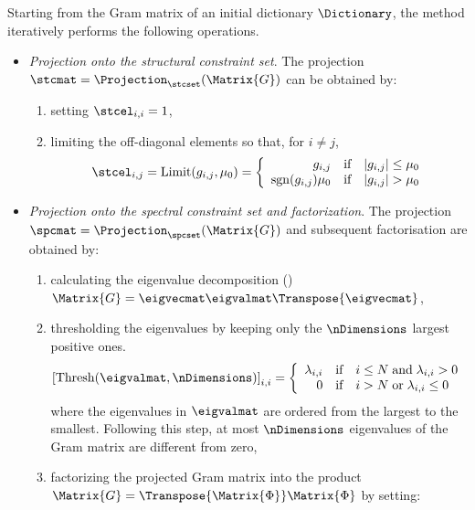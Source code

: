 \documentclass{article}
\def \Dic{\Matrix{\Phi}} %
\def \coherence{\mu} 		%
\def \Gram{\Matrix{G}} 						%
\def \gram{g} 								%
\begin{document}
Starting from the Gram matrix of an initial dictionary $\Dictionary$, the  method iteratively performs the following operations.
\begin{itemize}
\item \emph{Projection onto the structural constraint set}. The projection $\stcmat = \Projection_{\stcset}(\Gram)$ can be obtained by:
\begin{enumerate}
\item setting $\stcel_{i,i} = 1$,
\item limiting the off-diagonal elements so that, for $i \neq j$, 
\small
\begin{equation}\label{eq:pscs}
\stcel_{i,j} = \operatorname{Limit}({\gram}_{i,j},\coherence_{0}) = \left\{ \begin{array}{rl}
	\gram_{i,j}  & \text{if} \quad |\gram_{i,j}|\leq \coherence_{0} \\
	\operatorname{sgn}(\gram_{i,j})\coherence_{0}  & \text{if} \quad |\gram_{i,j}| > \coherence_{0}
\end{array} \right.
\end{equation}
\normalsize
\end{enumerate}
\item \emph{Projection onto the spectral constraint set and factorization}. The projection $\spcmat = \Projection_{\spcset}(\Gram)$ and subsequent factorisation are obtained by:
\begin{enumerate}
\item calculating the eigenvalue decomposition () $\Gram = \eigvecmat \eigvalmat \Transpose{\eigvecmat}$,
\item thresholding the eigenvalues by keeping only the $\nDimensions$ largest positive ones.
\begin{equation*}
	\left[\operatorname{Thresh}(\eigvalmat,\nDimensions) \right]_{i,i} = \left\{ \begin{array}{rl}
	\lambda_{i,i}  & \text{if} \quad i \leq N \; \text{and} \; \lambda_{i,i}>0 \\
	0  & \text{if} \quad i > N \; \text{or} \; \lambda_{i,i}\leq 0
	\end{array}\right.
\end{equation*}
where the eigenvalues in $\eigvalmat$ are ordered from the largest to the smallest. Following this step, at most $\nDimensions$ eigenvalues of the Gram matrix are different from zero,
\item factorizing the projected Gram matrix into the product $\Gram=\Transpose{\Dic}\Dic$ by setting:

\end{enumerate}
\end{itemize}
\end{document}

